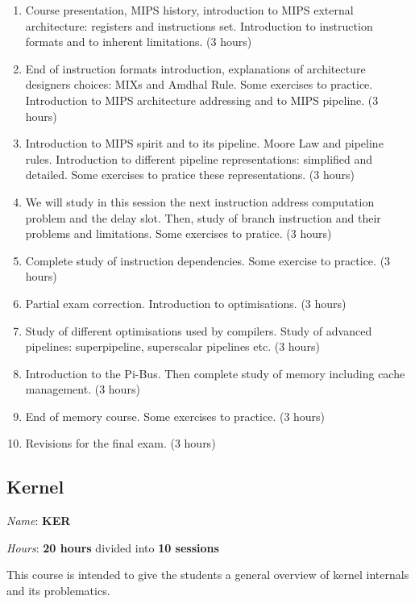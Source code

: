 \begin{multicols}{2}
\begin{enumerate}
  \item
    Course presentation, MIPS history, introduction to MIPS external
    architecture: registers and instructions set. Introduction to
    instruction formats and to inherent limitations. (3 hours)
  \item
    End of instruction formats introduction, explanations of architecture
    designers choices: MIXs and Amdhal Rule. Some exercises to practice.
    Introduction to MIPS architecture addressing and to MIPS pipeline.
    (3 hours)
  \item
    Introduction to MIPS spirit and to its pipeline. Moore Law and
    pipeline rules. Introduction to different pipeline representations:
    simplified and detailed. Some exercises to pratice these representations.
    (3 hours)
  \item
    We will study in this session the next instruction address computation
    problem and the delay slot. Then, study of branch instruction and their
    problems and limitations. Some exercises to pratice. (3 hours)
  \item
    Complete study of instruction dependencies. Some exercise to practice.
    (3 hours)
  \item
    Partial exam correction. Introduction to optimisations. (3 hours)
  \item
    Study of different optimisations used by compilers. Study of
    advanced pipelines: superpipeline, superscalar pipelines etc. (3 hours)
  \item
    Introduction to the Pi-Bus. Then complete study of memory including
    cache management. (3 hours)
  \item
    End of memory course. Some exercises to practice. (3 hours)
  \item
    Revisions for the final exam. (3 hours)
\end{enumerate}

%
%

\subsection{Kernel}

\textit{Name}: \textbf{KER}

\textit{Hours}: \textbf{20 hours} divided into \textbf{10 sessions}

This course is intended to give the students a general overview of
kernel internals and its problematics.


\end{multicols}
